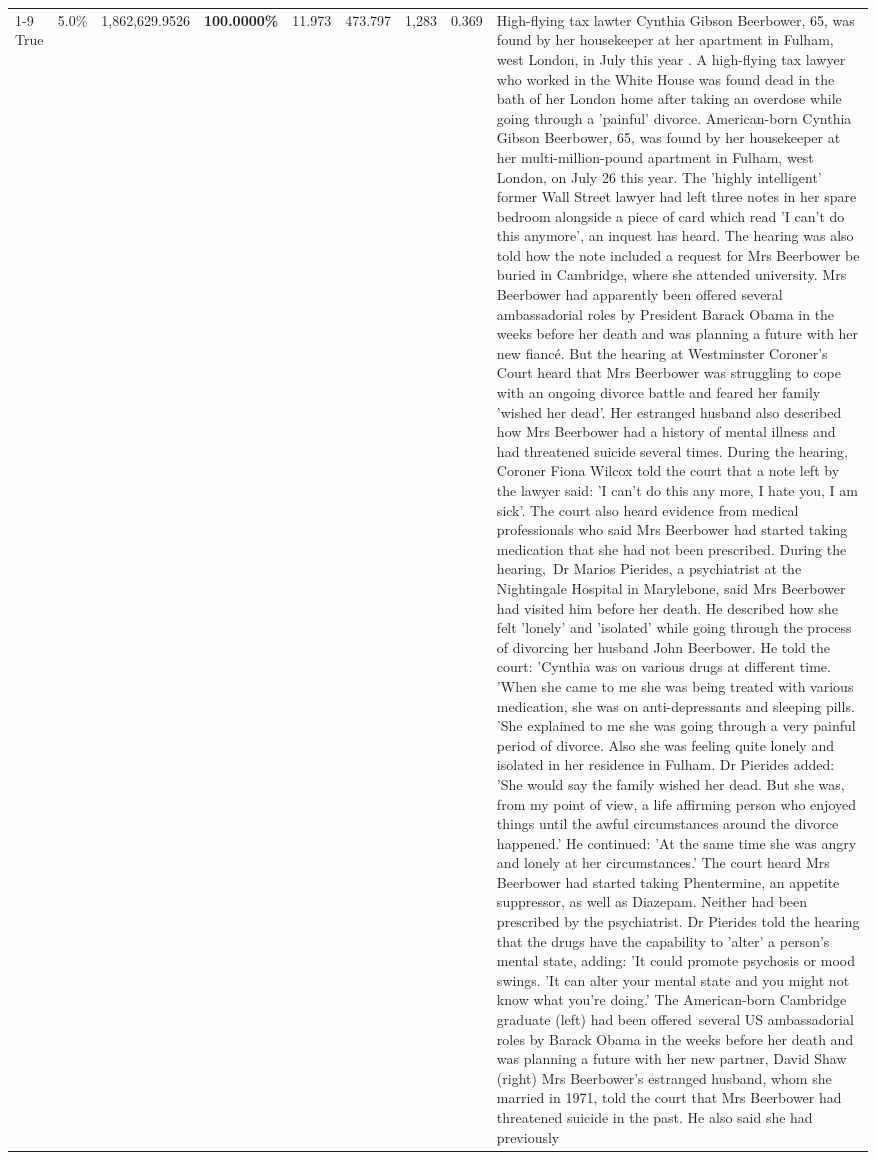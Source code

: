 \begin{table}[H]
\begin{tabular}{lllrlllll}
\cline{1-9}
True & 5.0\% & 1,862,629.9526 & \bfseries \color{red} 100.0000\% & 11.973 & 473.797 & 1,283 & 0.369 & High-flying tax lawter Cynthia Gibson Beerbower, 65, was found by her housekeeper at her apartment in Fulham, west London, in July this year . A high-flying tax lawyer who worked in the White House was found dead in the bath of her London home after taking an overdose while going through a 'painful' divorce. American-born Cynthia Gibson Beerbower, 65, was found by her housekeeper at her multi-million-pound apartment in Fulham, west London, on July 26 this year. The 'highly intelligent' former Wall Street lawyer had left three notes in her spare bedroom alongside a piece of card which read 'I can't do this anymore', an inquest has heard. The hearing was also told how the note included a request for Mrs Beerbower be buried in Cambridge, where she attended university. Mrs Beerbower had apparently been offered several ambassadorial roles by President Barack Obama in the weeks before her death and was planning a future with her new fiancé. But the hearing at Westminster Coroner's Court heard that Mrs Beerbower was struggling to cope with an ongoing divorce battle and feared her family 'wished her dead'. Her estranged husband also described how Mrs Beerbower had a history of mental illness and had threatened suicide several times. During the hearing, Coroner Fiona Wilcox told the court that a note left by the lawyer said: 'I can't do this any more, I hate you, I am sick'. The court also heard evidence from medical professionals who said Mrs Beerbower had started taking medication that she had not been prescribed. During the hearing, Dr Marios Pierides, a psychiatrist at the Nightingale Hospital in Marylebone, said Mrs Beerbower had visited him before her death. He described how she felt 'lonely' and 'isolated' while going through the process of divorcing her husband John Beerbower. He told the court: 'Cynthia was on various drugs at different time. 'When she came to me she was being treated with various medication, she was on anti-depressants and sleeping pills. 'She explained to me she was going through a very painful period of divorce. Also she was feeling quite lonely and isolated in her residence in Fulham. Dr Pierides added: 'She would say the family wished her dead. But she was, from my point of view, a life affirming person who enjoyed things until the awful circumstances around the divorce happened.' He continued: 'At the same time she was angry and lonely at her circumstances.' The court heard Mrs Beerbower had started taking Phentermine, an appetite suppressor, as well as Diazepam. Neither had been prescribed by the psychiatrist. Dr Pierides told the hearing that the drugs have the capability to 'alter' a person's mental state, adding: 'It could promote psychosis or mood swings. 'It can alter your mental state and you might not know what you're doing.' The American-born Cambridge graduate (left) had been offered several US ambassadorial roles by Barack Obama in the weeks before her death and was planning a future with her new partner, David Shaw (right) Mrs Beerbower's estranged husband, whom she married in 1971, told the court that Mrs Beerbower had threatened suicide in the past. He also said she had previously 
\end{tabular}
\end{table}
